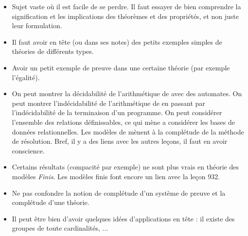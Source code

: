 \documentclass{agregfiche}
\begin{document}
\secpieges

\begin{itemize}
    \item Sujet vaste où il est facile de se perdre. Il faut essayer
	de bien comprendre la signification et les implications des
	théorèmes et des propriétés, et non juste leur formulation.
    \item Il faut avoir en tête (ou dans ses notes) des petits
      exemples simples de théories de différents types.
    \item Avoir un petit exemple de preuve dans une certaine théorie
      (par exemple l'égalité).
    \item On peut montrer la décidabilité de l'arithmétique de
       avec des automates. On peut montrer
      l'indécidabilité
      de l'arithmétique de  en passant par l'indécidabilité
      de la
      terminaison d'un programme. On peut considérer l'ensemble des
      relations définissables, ce qui mène a considérer les bases de
      données relationnelles. Les modèles de  mènent à la
      complétude de la méthode de résolution. Bref, il y a des liens
      avec les autres
      leçons, il faut en avoir conscience.
    \item Certains résultats (compacité par exemple) ne sont plus vrais en théorie des modèles \emph{Finis}. Les modèles finis font encore un lien avec la leçon 932.
    \item Ne pas confondre la notion de complétude d'un système de
      preuve et la complétude d'une théorie.
    \item Il peut être bien d'avoir quelques idées d'applications en
      tête : il existe des groupes de toute cardinalités, ...
\end{itemize}

\secquestionsclassiques
\end{document}

